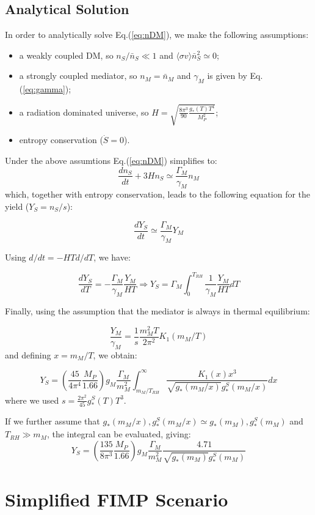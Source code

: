 \documentclass{article}
\def\bi{\begin{itemize}}
\def\ei{\end{itemize}}
\def\be{\begin{equation}}
\def\ee{\end{equation}}
\newcommand\Drv[2]{\frac{d #1}{d #2}}
\begin{document}
\subsection{Analytical Solution} \label{sec:analytic}

In order to analytically solve Eq.(\ref{eq:nDM}), we make the following assumptions:
\bi
\item a  weakly coupled DM, so $n_S/\bar{n}_S \ll 1$ and  $\langle \sigma v \rangle \bar{n}_S^2 \simeq 0$;
\item a strongly coupled mediator, so $n_M = \bar{n}_M$ and $\gamma_M$ is given by Eq.(\ref{eq:gamma});
\item a radiation dominated universe, so $H=\sqrt{\frac{8 \pi^3}{90}\frac{g_*(T) T^4}{M_P^2}}$;
\item entropy conservation ($\dot{S} = 0$).
\ei

Under the above assumtions Eq.(\ref{eq:nDM}) simplifies to:
\be
\Drv{n_{S}}{t} + 3H n_S  \simeq  \frac{\Gamma_M}{\gamma_M}  n_M
\ee
which, together with entropy conservation, leads to the following equation for the yield ($Y_S = n_S/s$):

\be
\Drv{Y_{S}}{t}  \simeq  \frac{\Gamma_M}{\gamma_M}  Y_M
\ee

Using $d/dt = -H T d/dT$, we have:

\be
\Drv{Y_S}{T} = -\frac{\Gamma_M}{\gamma_M}  \frac{Y_M}{H T} \Rightarrow Y_S = \Gamma_M   \int^{T_{RH}}_{0} \frac{1}{\gamma_M} \frac{Y_M}{H T} dT
\ee

Finally, using the assumption that the mediator is always in thermal equilibrium:

\be
\frac{Y_M}{\gamma_M} = \frac{1}{s} \frac{m_M^2 T}{2\pi^2} K_1\left(m_M/T\right)
\ee
and defining $x=m_M/T$, we obtain:

\be
Y_S = \left(\frac{45}{4 \pi^4} \frac{M_P}{1.66}\right)  g_M \frac{\Gamma_M}{m_M^2}   \int_{m_M/T_{RH}}^{\infty}  \frac{K_1(x) x^3}{\sqrt{g_*(m_M/x)} g_*^{S}(m_M/x)} dx
\ee
where we used $s = \frac{2 \pi^2}{45} g_*^{S}(T) T^3$.

If we further assume that $g_*(m_M/x), g_*^{S}(m_M/x) \simeq g_*(m_M), g_*^{S}(m_M)$ and $T_{RH} \gg m_M$, the integral
can be evaluated, giving:
\be
Y_S = \left(\frac{135}{8 \pi^3} \frac{M_P}{1.66}\right)  g_M \frac{\Gamma_M}{m_M^2} \frac{4.71}{\sqrt{g_*(m_M)} g_*^{S}(m_M)}
\ee



\section{Simplified FIMP Scenario} \label{sec:simp}
\end{document}
